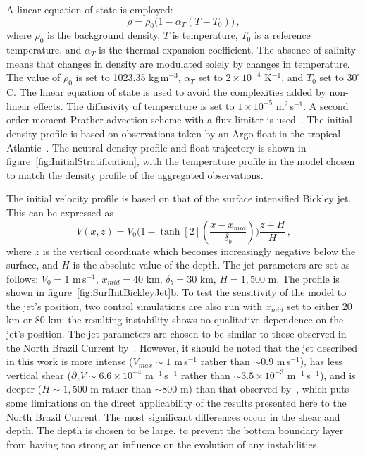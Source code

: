 A linear equation of state is employed:
\begin{equation}
    \rho = \rho_{0} \big(1 - \alpha_T (T - T_0 )\big) \, ,
    \label{eq:EOS}
\end{equation}
where $\rho_{0}$ is the background density, $T$ is temperature, $T_0$ is a reference temperature, and $\alpha_T$ is the thermal expansion coefficient. The absence of salinity means that changes in density are modulated solely by changes in temperature. The value of $\rho_{0}$ is set to 1023.35 kg$\,$m$^{-3}$, $\alpha_T$  set to $2 \times 10^{-4}$ K$^{-1}$, and $T_0$ set to $30^{\circ}$C. The linear equation of state is used to avoid the complexities added by non-linear effects. The diffusivity of temperature is set to $1 \times 10^{-5}$ m$^2$\,s$^{-1}$. A second order-moment Prather advection scheme with a flux limiter is used~\citep{Prather1986}. The initial density profile is based on observations taken by an Argo float in the tropical Atlantic~\citep{Argo2019}. The neutral density profile and float trajectory is shown in figure~\ref{fig:InitialStratification}, with the temperature profile in the model chosen to match the density profile of the aggregated observations.

The initial velocity profile is based on that of the surface intensified Bickley jet. This can be expressed as
\begin{equation}
    V(x, z) = V_0 \Bigg( 1 - \tanh[2](\frac{x - x_{mid}}{\delta_b})\Bigg) \frac{z + H}{H} \, ,
\end{equation}
where $z$ is the vertical coordinate which becomes increasingly negative below the surface, and $H$ is the absolute value of the depth. The jet parameters are set as follows: $V_0 = 1$ m\,s$^{-1}$, $x_{mid} = 40$ km, $\delta_b = 30$ km, $H = 1,500$ m. The profile is shown in figure~\ref{fig:SurfIntBickleyJet}b. To test the sensitivity of the model to the jet's position, two control simulations are also run with $x_{mid}$ set to either 20 km or 80 km: the resulting instability shows no qualitative dependence on the jet's position. The jet parameters are chosen to be similar to those observed in the North Brazil Current by~\citet{Johns1998}. However, it should be noted that the jet described in this work is more intense ($V_{max} \sim 1$ m\,s$^{-1}$ rather than $\sim 0.9$ m\,s$^{-1}$), has less vertical shear ($\partial_z V \sim 6.6\times 10^{-4}$ m$^{-1}$\,s$^{-1}$ rather than $\sim 3.5 \times 10^{-3}$ m$^{-1}$\,s$^{-1}$), and is deeper ($H\sim 1,500$ m rather than $\sim 800$ m) than that observed by~\citet{Johns1998}, which puts some limitations on the direct applicability of the results presented here to the North Brazil Current. The most significant differences occur in the shear and depth. The depth is chosen to be large, to prevent the bottom boundary layer from having too strong an influence on the evolution of any instabilities.

